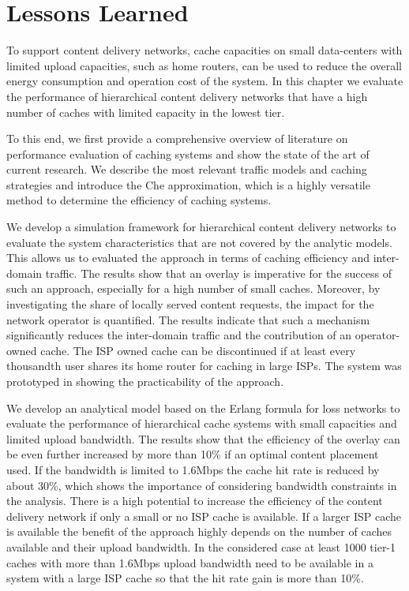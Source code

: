 \section{Lessons Learned}\label{sec:cloud:lessons_learned}
To support content delivery networks, cache capacities on small data-centers with limited upload capacities, such as home routers, can be used to reduce the overall energy consumption and operation cost of the system.
In this chapter we evaluate the performance of hierarchical content delivery networks that have a high number of caches with limited capacity in the lowest tier.

To this end, we first provide a comprehensive overview of literature on performance evaluation of caching systems and show the state of the art of current research.
We describe the most relevant traffic models and caching strategies and introduce the Che approximation, which is a highly versatile method to determine the efficiency of caching systems.

We develop a simulation framework for hierarchical content delivery networks to evaluate the system characteristics that are not covered by the analytic models.
This allows us to evaluated the approach in terms of caching efficiency and inter-domain traffic.
The results show that an overlay is imperative for the success of such an approach, especially for a high number of small caches.
Moreover, by investigating the share of locally served content requests, the impact for the network operator is quantified.
The results indicate that such a mechanism significantly reduces the inter-domain traffic and the contribution of an operator-owned cache.
The ISP owned cache can be discontinued if at least every thousandth user shares its home router for caching in large ISPs.
The system was prototyped in \cite{rbhorst-demo} showing the practicability of the approach.

We develop an analytical model based on the Erlang formula for loss networks to evaluate the performance of hierarchical cache systems with small capacities and limited upload bandwidth.
The results show that the efficiency of the overlay can be even further increased by more than 10\% if an optimal content placement used.
If the bandwidth is limited to 1.6Mbps the cache hit rate is reduced by about 30\%, which shows the importance of considering bandwidth constraints in the analysis.
There is a high potential to increase the efficiency of the content delivery network if only a small or no ISP cache is available.
If a larger ISP cache is available the benefit of the approach highly depends on the number of caches available and their upload bandwidth.
In the considered case at least 1000 tier-1 caches with more than 1.6Mbps upload bandwidth need to be available in a system with a large ISP cache so that the hit rate gain is more than 10\%.
